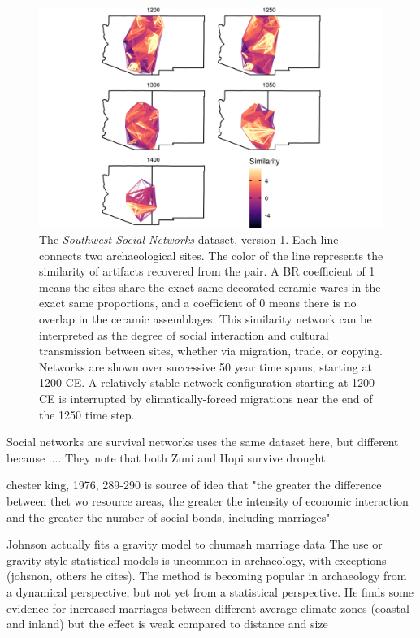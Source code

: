 \documentclass[fleqn,10pt]{wlscirep}
\begin{document}
\begin{figure}[ht]
\centering
\includegraphics[width=\linewidth]{figures/similarity_network.png}
\caption{The \emph{Southwest Social Networks} dataset, version 1. Each line connects two archaeological sites. The color of the line represents the similarity of artifacts recovered from the pair. A BR coefficient of 1 means the sites share the exact same decorated ceramic wares in the exact same proportions, and a coefficient of 0 means there is no overlap in the ceramic assemblages. This similarity network can be interpreted as the degree of social interaction and cultural transmission between sites, whether via migration, trade, or copying. Networks are shown over successive 50 year time spans, starting at 1200 CE. A relatively stable network configuration starting at 1200 CE is interrupted by climatically-forced migrations near the end of the 1250 time step.}
\label{fig:network-plot}
\end{figure}


Social networks are survival networks uses the same dataset here, but different because ....
They note that both Zuni and Hopi survive drought





chester king, 1976, 289-290 is source of idea that "the greater the difference between thet wo resource areas, the greater the intensity of economic interaction and the greater the number of social bonds, including marriages"

Johnson actually fits a gravity model to chumash marriage data
The use or gravity style statistical models is uncommon in archaeology, with exceptions (johsnon, others he cites). The method is becoming popular in archaeology from a dynamical perspective, but not yet from a statistical perspective.
He finds some evidence for increased marriages between different average climate zones (coastal and inland) but the effect is weak compared to distance and  size
\end{document}
